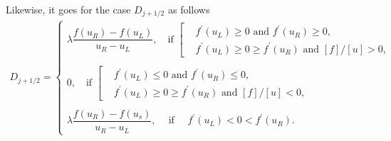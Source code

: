 \documentclass[12pt]{article}
\begin{document}
\begin{enumerate}
	      Likewise, it goes for the case $D_{j+1/2}$ as follows
	      \begin{align*}
		      D_{j+1/2}
		      = \begin{cases}
			      \lambda \dfrac{f(u_R) - f(u_L)}{u_R-u_L}, \quad  \text{if }
			      \left[
			      \begin{aligned}
				       & f^\prime(u_L) \geq 0 \text{ and } f^\prime(u_R) \geq 0,         \\
				       & f^\prime(u_L) \geq 0 \geq f^\prime(u_R) \text{ and } [f]/[u]>0,
			      \end{aligned}
			      \right.
			      \\
			      \\
			      0, \quad  \text{if }
			      \left[
			      \begin{aligned}
				       & f^\prime(u_L) \leq 0 \text{ and } f^\prime(u_R) \leq 0,         \\
				       & f^\prime(u_L) \geq 0 \geq f^\prime(u_R) \text{ and } [f]/[u]<0,
			      \end{aligned}
			      \right.
			      \\
			      \\
			      \lambda \dfrac{f(u_R) - f(u_s)}{u_R-u_L}, \quad \ \text{if } \quad
			      f^\prime(u_L) < 0 <  f^\prime(u_R).
		      \end{cases}
	      \end{align*}
	      

\end{enumerate}
\end{document}
